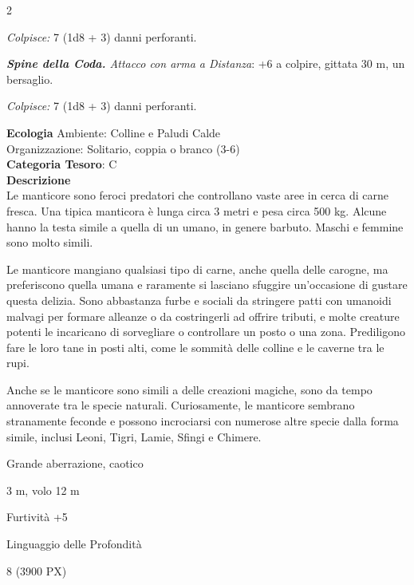 \begin{multicols}{2}
{\emph{Colpisce:} 7 (1d8 + 3) danni perforanti.

\emph{\textbf{Spine della Coda.} Attacco con arma a Distanza}: +6 a colpire, gittata 30 m, un bersaglio.

\emph{Colpisce:} 7 (1d8 + 3) danni perforanti.

\textbf{Ecologia}
Ambiente: Colline e Paludi Calde\\
Organizzazione: Solitario, coppia o branco (3-6)\\
\textbf{Categoria Tesoro}: C\\
\textbf{Descrizione}\\
Le manticore sono feroci predatori che controllano vaste aree in cerca di carne fresca. Una tipica manticora è lunga circa 3 metri e pesa circa 500 kg. Alcune hanno la testa simile a quella di un umano, in genere barbuto. Maschi e femmine sono molto simili.

Le manticore mangiano qualsiasi tipo di carne, anche quella delle carogne, ma preferiscono quella umana e raramente si lasciano sfuggire un'occasione di gustare questa delizia. Sono abbastanza furbe e sociali da stringere patti con umanoidi malvagi per formare alleanze o da costringerli ad offrire tributi, e molte creature potenti le incaricano di sorvegliare o controllare un posto o una zona. Prediligono fare le loro tane in posti alti, come le sommità delle colline e le caverne tra le rupi.

Anche se le manticore sono simili a delle creazioni magiche, sono da tempo annoverate tra le specie naturali. Curiosamente, le manticore sembrano stranamente feconde e possono incrociarsi con numerose altre specie dalla forma simile, inclusi Leoni, Tigri, Lamie, Sfingi e Chimere.

\begin{description}[noitemsep, topsep=0pt, parsep=0pt, partopsep=0pt, itemsep=1pt, leftmargin=2.35cm,  labelwidth=2.2cm, itemindent=0cm, listparindent=0pt] %
\setlength{\baselineskip}{10pt}
\item[\textbf{Taglia/Tipo}] Grande aberrazione, caotico
\item[\textbf{Caratt.}] 
\item[\textbf{Punti Ferita}] 
\item[\textbf{Movimento}] 3 m, volo 12 m
\item[\textbf{Tiri Salvez.}] 
\item[\textbf{Comp.}] Furtività +5
\item[\textbf{Sensi}] 
\item[\textbf{Linguaggi}] Linguaggio delle Profondità
\item[\textbf{Sfida}] 8 (3900 PX)
\end{description}
\smallskip

}
\end{multicols}
